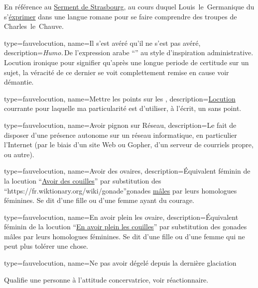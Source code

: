 {{{  En référence au \href{https://fr.wikipedia.org/wiki/Serments\_de\_Strasbourg}{Serment de Strasbourg}, au cours duquel Louis~le~Germanique du s’\href{https://fr.wikipedia.org/wiki/Serments\_de\_Strasbourg\#Le\_serment\_de\_Louis\_et\_des\_troupes\_de\_Charles\_en\_langue\_romane}{éxprimer} dans une langue romane pour se faire comprendre des troupes de Charles~le~Chauve.
}

{
  type=fauvelocution,
    name={Il s’est avéré qu’il ne s’est pas avéré},
    description={\emph{Humo.}\,De l’expression arabe \enquote{} au style d’inspiration administrative. Locution ironique pour signifier qu’après une longue periode de certitude sur un sujet, la véracité de ce dernier se voit complettement remise en cause voir démantie.}
}

{
  type=fauvelocution,
    name={Mettre les points sur les },
    description={\href{https://fr.wiktionary.org/wiki/mettre\_les\_points\_sur\_les\_i}{Locution} courrante pour laquelle ma particularité est d’utiliser, à l’écrit, un \href{https://fr.wikipedia.org/wiki/I\_sans\_point}{} sans point.}
    }

{
  type=fauvelocution,
    name={Avoir pignon sur Réseau},
    description={Le fait de disposer d’une présence autonome sur un réseau informatique, en particulier l’Internet (par le biais d’un site Web ou Gopher, d’un serveur de courriels propre, ou autre).}
}

{
  type=fauvelocution,
    name={Avoir des ovaires},
    description={Équivalent féminin de la locution \enquote{\href{https://fr.wiktionary.org/wiki/avoir\_des\_couilles}{Avoir des couilles}} par substitution des \enquote{https://fr.wiktionary.org/wiki/gonade}{gonades} \href{https://fr.wiktionary.org/wiki/testicule}{mâles} par leurs homologues féminines. Se dit d’une fille ou d’une femme ayant du courage.}
}

{
  type=fauvelocution,
    name={En avoir plein les ovaire},
    description={Équivalent féminin de la locution \enquote{\href{https://fr.wiktionary.org/wiki/en\_avoir\_plein\_les\_couilles}{En avoir plein les couilles}} par substitution des gonades mâles par leurs homologues féminines. Se dit d’une fille ou d’une femme qui ne peut plus tolérer une chose.}
}

{
  type=fauvelocution,
    name={Ne pas avoir dégelé depuis la dernière glaciation}
}
{
  Qualifie une personne à l’attitude concervatrice, voir réactionnaire.

}}}
